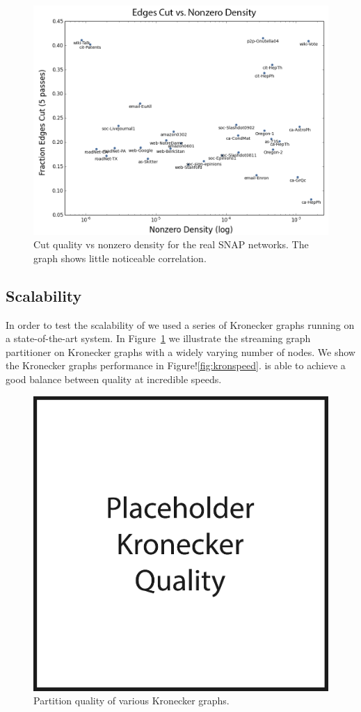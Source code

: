 \begin{figure}[h!]
\centering
\includegraphics[width=0.98\columnwidth] {figures/cutvsdensity}
\caption[Caption for]{Cut quality vs nonzero density for the real SNAP networks. The graph shows little noticeable correlation.}
\end{figure}

\subsection{Scalability}
In order to test the scalability of \ourmethod we used a series of Kronecker graphs running on a state-of-the-art system.
In Figure~\ref{fig:kronqual} we illustrate the streaming graph partitioner on Kronecker graphs with a widely varying number of nodes.
We show the Kronecker graphs performance in Figure!\ref{fig:kronspeed}. 
\ourmethod is able to achieve a good balance between quality at incredible speeds.


\begin{figure}[h!]
\centering
  \includegraphics[width=0.8\columnwidth]{figures/kronecker_quality_tests.pdf}
  \caption{Partition quality of various Kronecker graphs.}
  \label{fig:kronqual}
\end{figure}

